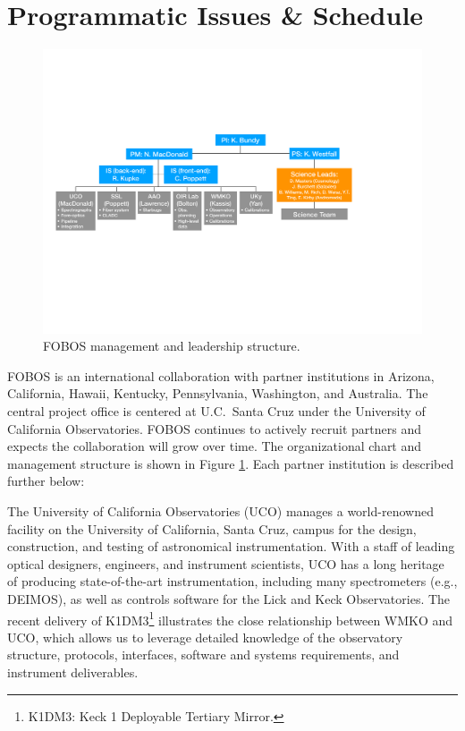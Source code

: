 \documentclass[oneside,11pt]{amsart}
\begin{document}
\bigskip
\section{Programmatic Issues \& Schedule}

\begin{figure}[h!]
\vskip -0.1in
\includegraphics[width=\textwidth]{org_chart_v2.pdf}
\caption{\small FOBOS management and leadership structure.}
\label{fig:org}
\end{figure}



FOBOS is an international collaboration with partner institutions in Arizona, California, Hawaii, Kentucky, Pennsylvania, Washington, and Australia.  The central project office is centered at U.C.\ Santa Cruz under the University of California Observatories.  FOBOS continues to actively recruit partners and expects the collaboration will grow over time.  The organizational chart and management structure is shown in Figure \ref{fig:org}.  Each partner institution is described further below:

\medskip
{}  The University of California Observatories (UCO) manages a
world-renowned facility on the University of California, Santa Cruz, campus for the design, construction, and testing
of astronomical instrumentation.  With a staff of leading optical designers, engineers, and instrument scientists, UCO
has a long heritage of producing state-of-the-art instrumentation, including many spectrometers (e.g., DEIMOS), as well
as controls software for the Lick and Keck Observatories.  The recent delivery of K1DM3\footnote{K1DM3: Keck 1
Deployable Tertiary Mirror.} illustrates the close relationship between WMKO and UCO, which allows us to leverage
detailed knowledge of the observatory structure, protocols, interfaces, software and systems requirements, and
instrument deliverables.
\end{document}
